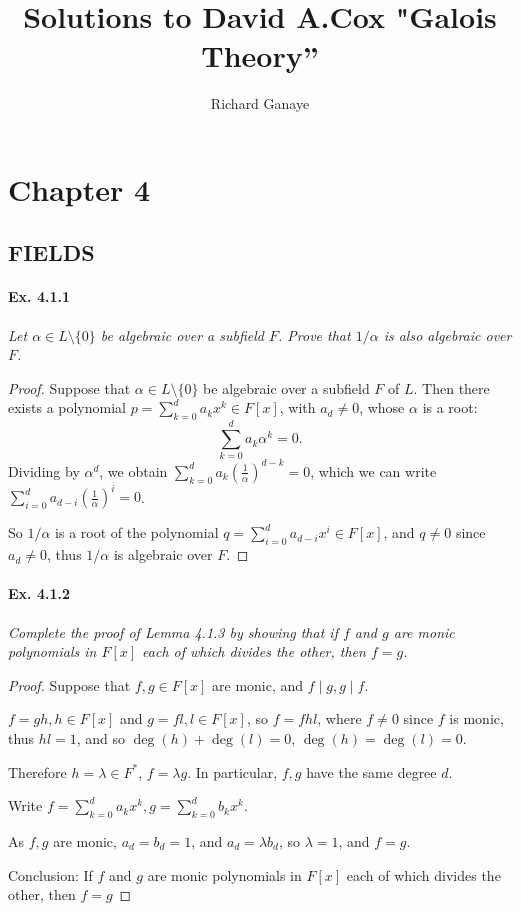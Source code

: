 \documentclass[11pt,a4paper]{article}
\title{Solutions to David A.Cox  "Galois Theory''}
\author{Richard Ganaye}
\begin{document}
\maketitle


\section{Chapter 4}

\subsection{FIELDS}

\paragraph{Ex. 4.1.1}

{\it Let $\alpha \in L \setminus \{0\}$ be algebraic over a subfield $F$. Prove that $1/\alpha$ is also algebraic over $F$.
}

\begin{proof}
Suppose that $\alpha \in L \setminus \{0\}$ be algebraic over a subfield $F$ of $L$. Then there exists a polynomial $p = \sum\limits_{k=0}^d a_k x^k \in F[x]$, with $a_d \neq 0$, whose $\alpha$ is a root:
$$\sum\limits_{k=0}^d a_k \alpha^k = 0.$$
Dividing by $\alpha^d$, we obtain $\sum\limits_{k=0}^d a_k\left(\frac{1}{\alpha}\right)^{d-k} = 0$, which we can write
$\sum\limits_{i=0}^d a_{d-i}\left(\frac{1}{\alpha}\right)^{i} = 0$.

So $1/\alpha$ is a root of the polynomial $q = \sum\limits_{i=0}^d a_{d-i}x^{i} \in F[x]$, and $q\neq 0$ since $a_d \neq0$, thus $1/\alpha$ is algebraic over $F$.
\end{proof}

\paragraph{Ex. 4.1.2}

{\it Complete the proof of Lemma 4.1.3 by showing that if $f$ and $g$ are monic polynomials in $F[x]$ each of which divides the other, then $f=g$.
}

\begin{proof}
Suppose that $f,g \in F[x]$  are monic, and $f\mid g, g\mid f$. 

$f = g h , h\in F[x]$ and $g = f l , l \in F[x]$, so $f = f hl$, where $f\neq 0$ since $f$ is monic, thus $hl=1$, and so $\deg(h)+ \deg(l)=0$, $\deg(h) = \deg(l) = 0$.

Therefore $h = \lambda \in F^*$, $f = \lambda g$. In particular, $f,g$ have the same degree $d$.

Write $f = \sum\limits_{k=0}^d a_k x^k, g =  \sum\limits_{k=0}^d b_k x^k$.

As $f,g$ are monic, $a_d=b_d=1$, and $a_d = \lambda b_d$, so $\lambda=1$, and $f = g$.

Conclusion: If $f$ and $g$ are monic polynomials in $F[x]$ each of which divides the other, then $f=g$
\end{proof}
\end{document}
